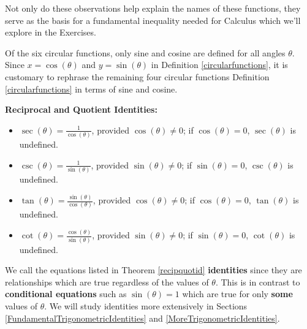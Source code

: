 \documentclass{ximera}
\begin{document}
 

 Not only do these observations help explain the names of these functions, they serve as the basis for a fundamental inequality needed for Calculus which we'll explore in the Exercises.

 

Of the six circular functions, only sine and cosine are defined for all angles $\theta$.  Since $x = \cos(\theta) $ and $y = \sin(\theta) $ in Definition \ref{circularfunctions}, it is customary to rephrase the remaining four circular functions  Definition \ref{circularfunctions} in terms of sine and cosine.  





\begin{theorem} \label{recipquotid}  \textbf{Reciprocal and Quotient Identities:}   

\begin{itemize}

\item $\sec(\theta) = \frac{1}{\cos(\theta)}$, provided $\cos(\theta) \neq 0$;  if $\cos(\theta) = 0$, $\sec(\theta)$ is undefined.

\item $\csc(\theta) = \frac{1}{\sin(\theta)}$, provided $\sin(\theta) \neq 0$;  if $\sin(\theta) = 0$, $\csc(\theta)$ is undefined.

\item $\tan(\theta) = \frac{\sin(\theta)}{\cos(\theta)}$, provided $\cos(\theta) \neq 0$;  if $\cos(\theta) = 0$, $\tan(\theta)$ is undefined.

\item $\cot(\theta) = \frac{\cos(\theta)}{\sin(\theta)}$, provided $\sin(\theta) \neq 0$;  if $\sin(\theta) = 0$, $\cot(\theta)$ is undefined.

\end{itemize}

\end{theorem}




We call the equations listed in Theorem \ref{recipquotid}  \textbf{identities} since they are relationships which are true regardless of the values of $\theta$.  This is in contrast to \textbf{conditional equations} such as $\sin(\theta) = 1$ which are true for only \textbf{some} values of $\theta$.  We will study identities more extensively in Sections \ref{FundamentalTrigonometricIdentities} and \ref{MoreTrigonometricIdentities}.
\end{document}
